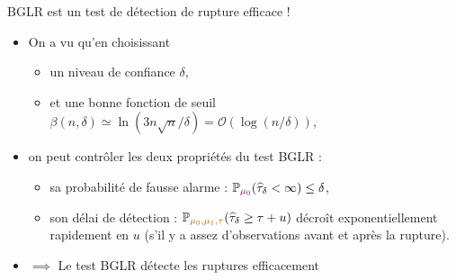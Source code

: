 \documentclass[11pt,french,ignorenonframetext,]{beamer}
\providecommand{\tightlist}{%
  \setlength{\itemsep}{0pt}\setlength{\parskip}{0pt}}
\begin{document}
\begin{frame}{BGLR est un test de détection de rupture efficace \dCooley{} !}

  \begin{itemize}
    \item
    On a vu qu'en choisissant
    \begin{itemize}\tightlist
      \item
      un niveau de confiance $\delta$,
      \item
      et une bonne fonction de seuil $\beta(n,\delta) \simeq \ln(3n \sqrt{n}/\delta) = \mathcal{O}(\log(n/\delta))$,
    \end{itemize}
    \pause
    \vspace*{10pt}
    \item
    on peut contrôler les deux propriétés du test BGLR :
    \begin{itemize}\tightlist
      \item
        sa \alert{probabilité de fausse alarme} :
        $\mathbb{P}_{\textcolor{darkpurple}{\mu_0}}(\widehat{\tau}_\delta < \infty) \leq \delta$,
      \item
        son \alert{délai de détection} :
        $\mathbb{P}_{\textcolor{gold}{\mu_0,\mu_1,\tau}} (\widehat{\tau}_{\delta} \geq \tau + u)$ décroît exponentiellement rapidement en $u$
        (s'il y a assez d'observations avant et après la rupture).
    \end{itemize}

    \vspace*{10pt}
    \item
    $\implies$ Le test BGLR détecte les ruptures efficacement \dCooley{}
  \end{itemize}


\end{frame}




\end{document}
